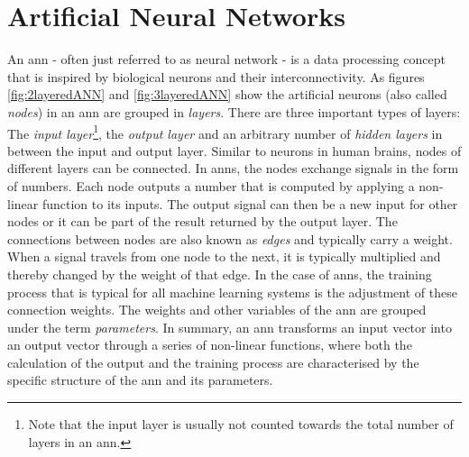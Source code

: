 \documentclass[
			   fontsize=11pt,
               paper=a4,
               bibliography=totoc,
               idxtotoc,
               headsepline,
               footsepline,
               footinclude=false,
               BCOR=12mm,
               DIV=13,
               openany,   %
               ]
               {scrbook}
\begin{document}
\section{Artificial Neural Networks} \label{ssection:ann}

An \acrlong{ann} - often just referred to as neural network - is a data processing concept that is inspired by biological neurons and their interconnectivity. As figures \autoref{fig:2layeredANN} and \autoref{fig:3layeredANN} show the artificial neurons (also called \textit{nodes}) in an \gls{ann} are grouped in \textit{layers}. There are three important types of layers: The \textit{input layer}\footnote{Note that the input layer is usually not counted towards the total number of layers in an \gls{ann}.}, the \textit{output layer} and an arbitrary number of \textit{hidden layers} in between the input and output layer. Similar to neurons in human brains, nodes of different layers can be connected. In \glspl{ann}, the nodes exchange signals in the form of numbers. Each node outputs a number that is computed by applying a non-linear function to its inputs. The output signal can then be a new input for other nodes or it can be part of the result returned by the output layer. The connections between nodes are also known as \textit{edges} and typically carry a weight. When a signal travels from one node to the next, it is typically multiplied and thereby changed by the weight of that edge. In the case of \glspl{ann}, the training process that is typical for all machine learning systems is the adjustment of these connection weights. The weights and other variables of the \gls{ann} are grouped under the term \textit{parameters}. In summary, an \gls{ann} transforms an input vector into an output vector through a series of non-linear functions, where both the calculation of the output and the training process are characterised by the specific structure of the \gls{ann} and its parameters.
\end{document}
